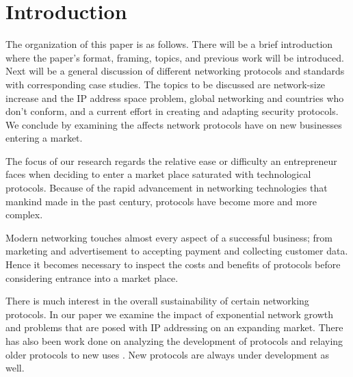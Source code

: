 \section{Introduction}

%
%


The organization of this paper is as follows. There will be a brief 
introduction where the paper's format, framing, topics, and previous work will
be introduced. Next will be a general discussion of different networking protocols and standards with corresponding
case studies. The topics to be discussed are network-size increase and the IP address space problem, 
global networking and countries who don't
conform, and a current effort in creating and adapting security protocols. We conclude by examining
the affects network protocols have on new businesses entering a market.


The focus of our research regards the relative ease or difficulty 
an entrepreneur faces when deciding to enter a market place saturated with technological protocols. 
Because of the rapid advancement in networking technologies that mankind made in the past
century, protocols have become more and more complex. 


Modern networking touches almost every aspect of a successful business; from 
marketing and advertisement to accepting payment and collecting customer data.
Hence it becomes necessary to inspect the costs and benefits of  
protocols before considering entrance into a market place. 


There is much interest in the overall sustainability of certain networking protocols\cite{4124025}. 
In our paper we examine the impact of exponential network growth and problems that are posed with 
IP addressing on an expanding market. There has also been work done on analyzing the development of protocols
\cite{4375858} and relaying older protocols to new uses
\cite{6296937}.  New protocols are always under development as well\cite{5977081}. 


